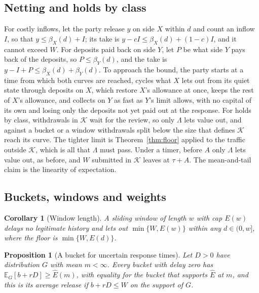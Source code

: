 \documentclass[conference,compsoc]{IEEEtran}
\numberwithin{equation}{section}
\theoremstyle{plain}
\newtheorem{proposition}[theorem]{Proposition}
\newtheorem{corollary}[theorem]{Corollary}
\theoremstyle{definition}
\theoremstyle{remark}
\begin{document}
\subsection{Netting and holds by class}\label{app:netproof}

For costly inflows, let the party release $y$ on side $X$ within $d$ and count an inflow $I$, so that $y \le \beta_X(d) + I$; its take is $y - cI \le \beta_X(d) + (1-c)I$, and it cannot exceed $W$. For deposits paid back on side $Y$, let $P$ be what side $Y$ pays back of the deposits, so $P \le \beta_Y(d)$, and the take is $y - I + P \le \beta_X(d) + \beta_Y(d)$. To approach the bound, the party starts at a time from which both curves are reached, cycles what $X$ lets out from its quiet state through deposits on $X$, which restore $X$'s allowance at once, keeps the rest of $X$'s allowance, and collects on $Y$ as fast as $Y$'s limit allows, with no capital of its own and losing only the deposits not yet paid out at the response. For holds by class, withdrawals in $\mathcal{K}$ wait for the review, so only $\Lambda$ lets value out, and against a bucket or a window withdrawals split below the size that defines $\mathcal{K}$ reach its curve. The tighter limit is Theorem~\ref{thm:floor} applied to the traffic outside $\mathcal{K}$, which is all that $\Lambda$ must pass. Under a timer, before $A$ only $\Lambda$ lets value out, as before, and $W$ submitted in $\mathcal{K}$ leaves at $\tau + A$. The mean-and-tail claim is the linearity of expectation.

\subsection{Buckets, windows and weights}\label{app:bucketproof}

\begin{corollary}[Window length]\label{cor:windows}
A sliding window of length $w$ with cap $E(w)$ delays no legitimate history and lets out $\min\{W, E(w)\}$ within any $d \in (0, w]$, where the floor is $\min\{W, E(d)\}$.
\end{corollary}

\begin{proposition}[A bucket for uncertain response times]\label{prop:mean}
Let $D > 0$ have distribution $G$ with mean $m < \infty$. Every bucket with delay zero has $\mathbb{E}_G[b + rD] \ge \hat{E}(m)$, with equality for the bucket that supports $\hat{E}$ at $m$, and this is its average release if $b + rD \le W$ on the support of $G$.
\end{proposition}
\end{document}
